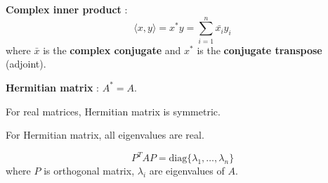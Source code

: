 \begin{definition}
    \textbf{Complex inner product} :
    $$\langle x,y \rangle = x^* y = \sum_{i=1}^{n} \bar{x_i} y_i$$
    where $\bar{x}$ is the \textbf{complex conjugate} and $x^*$ is the \textbf{conjugate transpose} (adjoint).
\end{definition}

\begin{definition}
    \textbf{Hermitian matrix} : $A^* = A$.
    
    For real matrices, Hermitian matrix is symmetric.

    For Hermitian matrix, all eigenvalues are real.    
\end{definition}

\begin{theorem}
    $$P^T A P = \text{diag} \{\lambda_1,\dots,\lambda_n\}$$
    where $P$ is orthogonal matrix, $\lambda_i$ are eigenvalues of $A$.
\end{theorem}

% 


